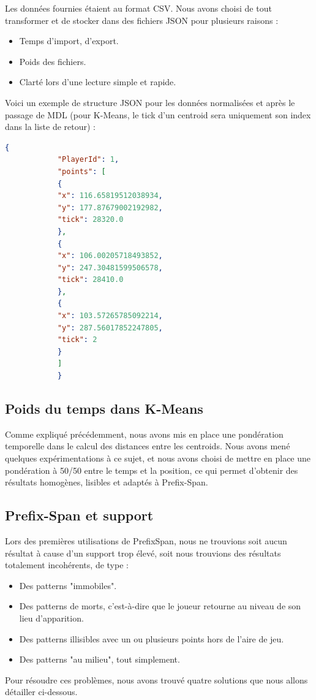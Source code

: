 \documentclass{article}
\begin{document}
            Les données fournies étaient au format CSV. Nous avons choisi de tout transformer et de stocker dans des fichiers JSON pour plusieurs raisons :
            \begin{itemize}
            \item Temps d'import, d'export.
            \item Poids des fichiers.
            \item Clarté lors d'une lecture simple et rapide.
            \end{itemize}
            Voici un exemple de structure JSON pour les données normalisées et après le passage de MDL (pour K-Means, le tick d'un centroid sera uniquement son index dans la liste de retour) :
            \newpage
            \begin{lstlisting}[language=json]
            {
            "PlayerId": 1,
            "points": [
            {
            "x": 116.65819512038934,
            "y": 177.87679002192982,
            "tick": 28320.0
            },
            {
            "x": 106.00205718493852,
            "y": 247.30481599506578,
            "tick": 28410.0
            },
            {
            "x": 103.57265785092214,
            "y": 287.56017852247805,
            "tick": 2
            }
            ]
            }
            \end{lstlisting}
        \subsection{Poids du temps dans K-Means}
        Comme expliqué précédemment, nous avons mis en place une pondération temporelle dans le calcul des distances entre les centroids. Nous avons mené quelques expérimentations à ce sujet, et nous avons choisi de mettre en place une pondération à 50/50 entre le temps et la position, ce qui permet d’obtenir des résultats homogènes, lisibles et adaptés à Prefix-Span.
        
        \subsection{Prefix-Span et support}

            Lors des premières utilisations de PrefixSpan, nous ne trouvions soit aucun résultat à cause d'un support trop élevé, soit nous trouvions des résultats totalement incohérents, de type :
            \begin{itemize}
            \item Des patterns "immobiles".
            \item Des patterns de morts, c’est-à-dire que le joueur retourne au niveau de son lieu d’apparition.
            \item Des patterns illisibles avec un ou plusieurs points hors de l’aire de jeu.
            \item Des patterns "au milieu", tout simplement.
            \end{itemize}
            Pour résoudre ces problèmes, nous avons trouvé quatre solutions que nous allons détailler ci-dessous.
\end{document}
